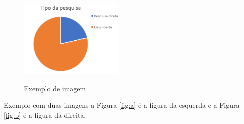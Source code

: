 \begin{figure}[h]%
    \caption{Exemplo de imagem}
    \centering
    \includegraphics[width=5cm]{imagens/grafico.png}
    \label{figura:qualquernome}
\end{figure}


Exemplo com duas imagens a Figura \ref{fig:a} é a figura da esquerda e a Figura \ref{fig:b} é a figura da direita.

